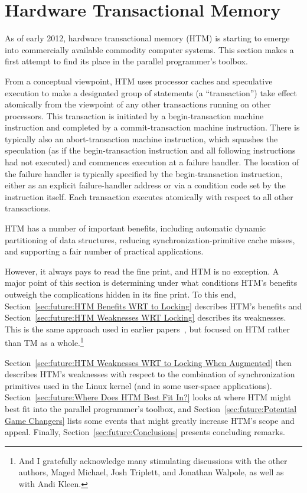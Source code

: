 
\section{Hardware Transactional Memory}
\label{sec:future:Hardware Transactional Memory}

As of early 2012, hardware transactional memory (HTM) is starting to emerge
into commercially available commodity computer systems.
This section makes a first attempt to find its place in the parallel
programmer's toolbox.

From a conceptual viewpoint, HTM uses processor caches and speculative
execution to make a designated group of statements (a ``transaction'')
take effect atomically
from the viewpoint of any other transactions running on other processors.
This transaction is initiated by a
begin-transaction machine instruction and completed by a commit-transaction
machine instruction.
There is typically also an abort-transaction machine instruction, which
squashes the speculation (as if the begin-transaction instruction and
all following instructions had not executed) and commences execution
at a failure handler.
The location of the failure handler is typically specified by the
begin-transaction instruction, either as an explicit failure-handler
address or via a condition code set by the instruction itself.
Each transaction executes atomically with respect to all other transactions.

HTM has a number of important benefits, including automatic
dynamic partitioning of data structures, reducing synchronization-primitive
cache misses, and supporting a fair number of practical applications.

However, it always pays to read the fine print, and HTM is no exception.
A major point of this section is determining under what conditions HTM's
benefits outweigh the complications hidden in its fine print.
To this end, Section~\ref{sec:future:HTM Benefits WRT to Locking}
describes HTM's benefits and
Section~\ref{sec:future:HTM Weaknesses WRT Locking} describes its weaknesses.
This is the same approach used in earlier
papers~\cite{McKenney2007PLOSTM,PaulEMcKenney2010OSRGrassGreener},
but focused on HTM rather than TM as a whole.\footnote{
	And I gratefully acknowledge many stimulating
	discussions with the other authors, Maged Michael, Josh Triplett,
	and Jonathan Walpole, as well as with Andi Kleen.}

Section~\ref{sec:future:HTM Weaknesses WRT to Locking When Augmented} then describes
HTM's weaknesses with respect to the combination of synchronization
primitives used in the Linux kernel (and in some user-space applications).
Section~\ref{sec:future:Where Does HTM Best Fit In?} looks at where HTM
might best fit into the parallel programmer's toolbox, and
Section~\ref{sec:future:Potential Game Changers} lists some events that might
greatly increase HTM's scope and appeal.
Finally, Section~\ref{sec:future:Conclusions}
presents concluding remarks.

